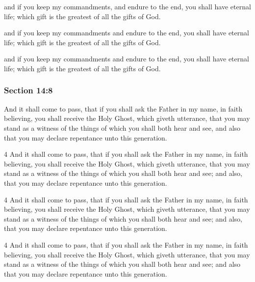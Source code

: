 		\begin{framed}
		\scriptsize
			\begin{compactdesc}
				\item[JSP] and if you keep my commandments, and endure to the end, you shall have eternal life; which gift is the greatest of all the gifts of God.
				\item[DC 1835] and if you keep my commandments and endure to the end, you shall have eternal life; which gift is the greatest of all the gifts of God.
				\item[DC 1844] and if you keep my commandments and endure to the end, you shall have eternal life; which gift is the greatest of all the gifts of God.
			\end{compactdesc}
		\end{framed}

	\subsubsection{Section 14:8} %
		\label{DC14-8}

		And it shall come to pass, that if you shall ask the Father in my name, in faith believing, you shall receive the Holy Ghost, which giveth utterance, that you may stand as a witness of the things of which you shall both hear and see, and also that you may declare repentance unto this generation.

		\begin{framed}
		\scriptsize
			\begin{compactdesc}
				\item[JSP] 4 And it shall come to pass, that if you shall ask the Father in my name, in faith believing, you shall receive the Holy Ghost, which giveth utterance, that you may stand as a witness of the things of which you shall both hear and see; and also, that you may declare repentance unto this generation.
				\item[DC 1835] 4 And it shall come to pass, that if you shall ask the Father in my name, in faith believing, you shall receive the Holy Ghost, which giveth utterance, that you may stand as a witness of the things of which you shall both hear and see; and also, that you may declare repentance unto this generation.
				\item[DC 1844] 4 And it shall come to pass, that if you shall ask the Father in my name, in faith believing, you shall receive the Holy Ghost, which giveth utterance, that you may stand as a witness of the things of which you shall both hear and see; and also that you may declare repentance unto this generation.
			\end{compactdesc}
		\end{framed}


